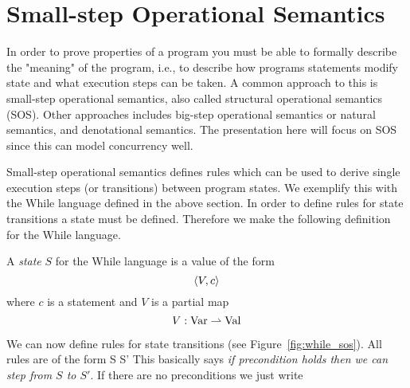 \section{Small-step Operational Semantics} \label{sec:language_semantics}

In order to prove properties of a program you must be able to formally describe
the "meaning" of the program, i.e., to describe how programs statements modify
state and what execution steps can be taken. A common approach to this is
small-step operational semantics, also called structural operational semantics
(SOS). Other approaches includes big-step operational semantics or natural
semantics, and denotational semantics. The presentation here will focus on SOS
since this can model concurrency well. 

Small-step operational semantics defines rules which can be used to derive
single execution steps (or transitions) between program states. We exemplify
this with the While language defined in the above section. In order to define
rules for state transitions a state must be defined. Therefore we make the
following definition for the While language.

\begin{definition}
  A \emph{state} $S$ for the While language is a value of the form
  \begin{equation*}
    \langle V, c \rangle  
  \end{equation*}
  where $c$ is a statement and $V$ is a partial map
  \begin{equation*}
    V: \mbox{$\mathrm{Var}$} \rightharpoonup \mbox{$\mathrm{Val}$}
  \end{equation*}
\end{definition}

We can now define rules for state transitions (see Figure~\ref{fig:while_sos}).
All rules are of the form
{S \rightarrow S'}
This basically says {\it if precondition holds then we can step from $S$
to $S'$}. If there are no preconditions we just write


